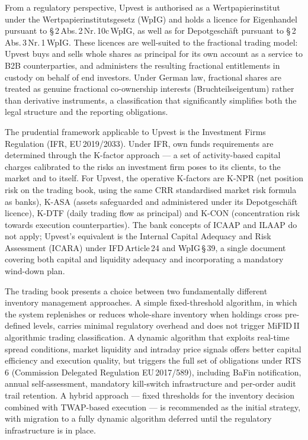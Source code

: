 \documentclass[12pt,a4paper]{report}
\begin{document}
From a regulatory perspective, Upvest is authorised as a Wertpapierinstitut under the
Wertpapierinstitutsgesetz (WpIG) and holds a licence for Eigenhandel pursuant to
\S\,2\,Abs.\,2\,Nr.\,10c\,WpIG, as well as for Depotgesch{\"a}ft pursuant to
\S\,2\,Abs.\,3\,Nr.\,1\,WpIG. These licences are well-suited to the fractional trading model:
Upvest buys and sells whole shares as principal for its own account as a service to B2B
counterparties, and administers the resulting fractional entitlements in custody on behalf of
end investors. Under German law, fractional shares are treated as genuine fractional
co-ownership interests (Bruchteilseigentum) rather than derivative instruments, a
classification that significantly simplifies both the legal structure and the reporting
obligations.

The prudential framework applicable to Upvest is the Investment Firms Regulation (IFR,
EU\,2019/2033). Under IFR, own funds requirements are determined through the K-factor
approach --- a set of activity-based capital charges calibrated to the risks an investment firm
poses to its clients, to the market and to itself. For Upvest, the operative K-factors are
K-NPR (net position risk on the trading book, using the same CRR standardised market risk
formula as banks), K-ASA (assets safeguarded and administered under its Depotgesch{\"a}ft
licence), K-DTF (daily trading flow as principal) and K-CON (concentration risk towards
execution counterparties). The bank concepts of ICAAP and ILAAP do not apply; Upvest's
equivalent is the Internal Capital Adequacy and Risk Assessment (ICARA) under
IFD\,Article\,24 and WpIG\,\S\,39, a single document covering both capital and liquidity
adequacy and incorporating a mandatory wind-down plan.

The trading book presents a choice between two fundamentally different inventory management
approaches. A simple fixed-threshold algorithm, in which the system replenishes or reduces
whole-share inventory when holdings cross pre-defined levels, carries minimal regulatory
overhead and does not trigger MiFID\,II algorithmic trading classification. A dynamic
algorithm that exploits real-time spread conditions, market liquidity and intraday price
signals offers better capital efficiency and execution quality, but triggers the full set of
obligations under RTS\,6 (Commission Delegated Regulation EU\,2017/589), including BaFin
notification, annual self-assessment, mandatory kill-switch infrastructure and per-order audit
trail retention. A hybrid approach --- fixed thresholds for the inventory decision combined
with TWAP-based execution --- is recommended as the initial strategy, with migration to a
fully dynamic algorithm deferred until the regulatory infrastructure is in place.
\end{document}
